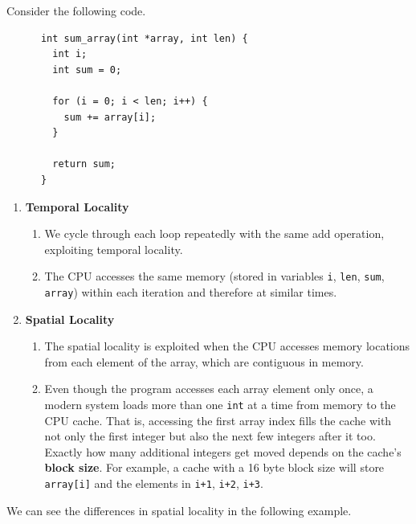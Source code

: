   \begin{example}[Locality]
    \label{ex:locality}
    Consider the following code. 
    \begin{lstlisting}
      int sum_array(int *array, int len) {
        int i;
        int sum = 0;

        for (i = 0; i < len; i++) {
          sum += array[i];
        }

        return sum;
      }
    \end{lstlisting}
    \begin{enumerate}
      \item \textbf{Temporal Locality}
        \begin{enumerate}
          \item We cycle through each loop repeatedly with the same add operation, exploiting temporal locality.  
          \item The CPU accesses the same memory (stored in variables \texttt{i}, \texttt{len}, \texttt{sum}, \texttt{array}) within each iteration and therefore at similar times. 
        \end{enumerate}
      \item \textbf{Spatial Locality}
        \begin{enumerate}
          \item The spatial locality is exploited when the CPU accesses memory locations from each element of the array, which are contiguous in memory. 
          \item Even though the program accesses each array element only once, a modern system loads more than one \texttt{int} at a time from memory to the CPU cache. That is, accessing the first array index fills the cache with not only the first integer but also the next few integers after it too. Exactly how many additional integers get moved depends on the cache's \textbf{block size}. For example, a cache with a 16 byte block size will store \texttt{array[i]} and the elements in \texttt{i+1}, \texttt{i+2}, \texttt{i+3}. 
        \end{enumerate}
    \end{enumerate}
  \end{example}

  We can see the differences in spatial locality in the following example. 

